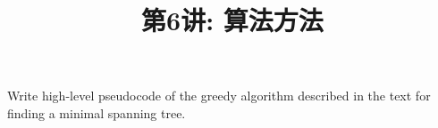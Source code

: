 \documentclass[a4paper, justified]{tufte-handout}
\title{第6讲: 算法方法}
\date{\zhtoday} %
\begin{document}
\maketitle
\noplagiarism %
\begin{abstract}
\end{abstract}
\beginrequired

\begin{problem}[DH 4-8]
\end{problem}

\begin{solution}
\end{solution}

\begin{problem}[DH 4-9]
\end{problem}

\begin{solution}
\end{solution}

\begin{problem}[DH 4-12]
  Write high-level pseudocode of the greedy algorithm described in the text 
  for finding a minimal spanning tree.
\end{problem}

\begin{solution}
\end{solution}

\begin{problem}[DH 4-13]
\end{problem}

\begin{solution}
\end{solution}

\beginoptional

\begin{problem}[DH 4-10]
\end{problem}

\begin{solution}
\end{solution}
\end{document}
